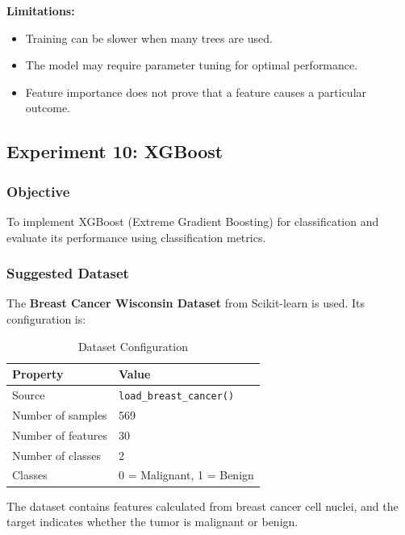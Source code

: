 \documentclass[a4paper,11pt]{article}
\begin{document}
\textbf{Limitations:}
\begin{itemize}
    \item Training can be slower when many trees are used.
    \item The model may require parameter tuning for optimal performance.
    \item Feature importance does not prove that a feature causes a particular outcome.
\end{itemize}




\subsection{Experiment 10: XGBoost}

\subsubsection{Objective}
To implement XGBoost (Extreme Gradient Boosting) for classification and evaluate its performance using classification metrics.

\subsubsection{Suggested Dataset}
The \textbf{Breast Cancer Wisconsin Dataset} from Scikit-learn is used. Its configuration is:

\begin{table}[H]
\centering
\caption{Dataset Configuration}
\begin{tabular}{ll}
\toprule
\textbf{Property} & \textbf{Value} \\
\midrule
Source             & \texttt{load\_breast\_cancer()} \\
Number of samples  & 569 \\
Number of features & 30 \\
Number of classes  & 2 \\
Classes            & 0 = Malignant, 1 = Benign \\
\bottomrule
\end{tabular}
\end{table}

The dataset contains features calculated from breast cancer cell nuclei, and the target indicates whether the tumor is malignant or benign.
\end{document}
